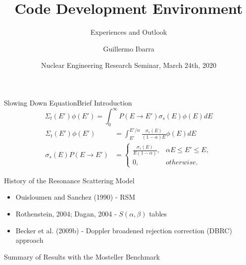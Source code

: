 \documentclass[sans,mathserif,aspectratio=169]{beamer}
\title{Code Development Environment}
\subtitle{Experiences and Outlook}
\author[Guillermo Ibarra]{Guillermo Ibarra}
\date{Nuclear Engineering Research Seminar, March 24th, 2020}
\begin{document}
\begin{frame}
\titlepage
\end{frame}

\begin{frame}{Slowing Down Equation}{Brief Introduction}
\begin{equation*}
\Sigma_t (E') \phi (E') = \int_0^\infty P (E \to E') \sigma_s (E) \phi (E) dE
\end{equation*}
\pause
\begin{align*}
\Sigma_t (E') \phi (E') &= \int_{E'}^{E'/\alpha} \frac{\sigma_s (E)}{(1-\alpha) E} \phi (E) dE \\
\sigma_s (E) P (E \to E') &= 
\begin{cases}
	\frac{\sigma_s (E)}{E (1 - \alpha)}, & \alpha E \le E' \le E,\\
	0, & otherwise.
\end{cases}
\end{align*}
\end{frame}

\begin{frame}{History of the Resonance Scattering Model}
\begin{itemize}
\item Ouisloumen and Sanchez (1990) - RSM
\item Rothenstein, 2004; Dagan, 2004 - $S(\alpha, \beta)$ tables
\item Becker et al. (2009b) - Doppler broadened rejection correction (DBRC) approach
\end{itemize}
\end{frame}

\begin{frame}{Summary of Results with the Mosteller Benchmark}
\centering
{}
\end{frame}
\end{document}
